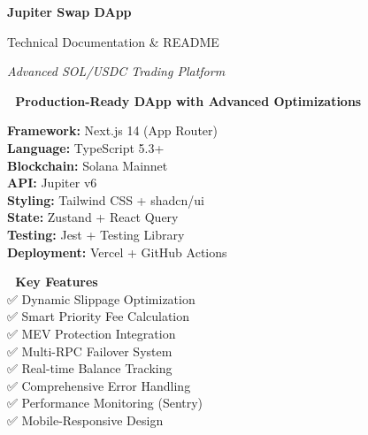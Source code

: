 \documentclass[11pt,a4paper]{article}
\begin{document}
\begin{titlepage}
    \centering
    \vspace*{1.5cm}
    
    {\Huge\textbf{\textcolor{jupiterBlue}{Jupiter Swap DApp}}\par}
    \vspace{0.5cm}
    {\LARGE\textcolor{deauraPurple}{Technical Documentation \& README}\par}
    \vspace{0.3cm}
    {\Large\textit{Advanced SOL/USDC Trading Platform}\par}
    
    \vspace{1.5cm}
    
    \begin{tcolorbox}[colback=jupiterBlue!10,colframe=jupiterBlue,width=0.9\textwidth]
        \centering
        \textbf{🚀 Production-Ready DApp with Advanced Optimizations}\\
        \vspace{0.5cm}
        \begin{multicols}{2}
        \textbf{Framework:} Next.js 14 (App Router)\\
        \textbf{Language:} TypeScript 5.3+\\
        \textbf{Blockchain:} Solana Mainnet\\
        \textbf{API:} Jupiter v6\\
        \textbf{Styling:} Tailwind CSS + shadcn/ui\\
        \textbf{State:} Zustand + React Query\\
        \textbf{Testing:} Jest + Testing Library\\
        \textbf{Deployment:} Vercel + GitHub Actions
        \end{multicols}
    \end{tcolorbox}
    
    \vspace{1.5cm}
    
    \begin{tcolorbox}[colback=solanaGreen!10,colframe=solanaGreen,width=0.8\textwidth]
        \centering
        \textbf{🎯 Key Features}\\
        \vspace{0.3cm}
        ✅ Dynamic Slippage Optimization\\
        ✅ Smart Priority Fee Calculation\\
        ✅ MEV Protection Integration\\
        ✅ Multi-RPC Failover System\\
        ✅ Real-time Balance Tracking\\
        ✅ Comprehensive Error Handling\\
        ✅ Performance Monitoring (Sentry)\\
        ✅ Mobile-Responsive Design
    \end{tcolorbox}
    

\end{titlepage}
\end{document}

